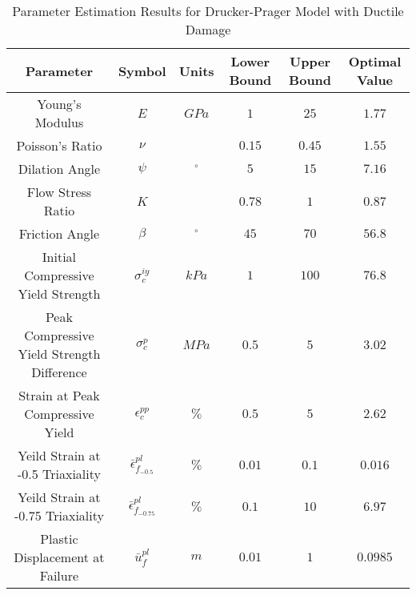 \begin{table}[]
\centering
\caption{Parameter Estimation Results for Drucker-Prager Model with Ductile Damage}
\label{tab:paramDrucker}
\begin{tabular}{@{}cccccc@{}}
\toprule
Parameter                                  & Symbol                            & Units      & Lower Bound & Upper Bound & Optimal Value \\ \midrule
Young's Modulus                            & $E$                               & $GPa$      & $1$         & $25$        & $1.77$        \\
Poisson's Ratio                            & $\nu$                             &            & $0.15$      & $0.45$      & $1.55$        \\
Dilation Angle                             & $\psi$                            & $^{\circ}$ & $5$         & $15$        & $7.16$        \\
Flow Stress Ratio                          & $K$                               &            & $0.78$      & $1$         & $0.87$        \\
Friction Angle                             & $\beta$                           & $^{\circ}$ & $45$        & $70$        & $56.8$        \\
Initial Compressive Yield Strength         & $\sigma_c^{iy}$                   & $kPa$      & $1$         & $100$       & $76.8$        \\
Peak Compressive Yield Strength Difference & $\sigma_c^{p}$                    & $MPa$      & $0.5$       & $5$         & $3.02$        \\
Strain at Peak Compressive Yield           & $\epsilon_c^{pp}$                 & $\%$       & $0.5$       & $5$         & $2.62$        \\
Yeild Strain at -0.5 Triaxiality           & $\bar{\epsilon}^{pl}_{f_{-0.5}}$  & $\%$       & $0.01$      & $0.1$       & $0.016$       \\
Yeild Strain at -0.75 Triaxiality          & $\bar{\epsilon}^{pl}_{f_{-0.75}}$ & $\%$       & $0.1$       & $10$        & $6.97$        \\
Plastic Displacement at Failure            & $\bar{u}^{pl}_f$                  & $m$        & $0.01$      & $1$         & $0.0985$      \\ \bottomrule
\end{tabular}
\end{table}

